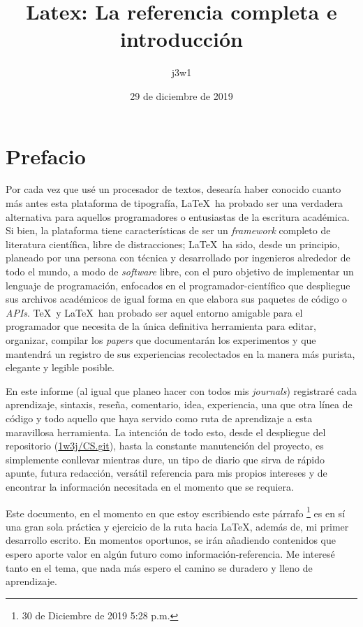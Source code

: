 \documentclass[11pt,a4paper]{book}
\title{Latex: La referencia completa e introducción}
\author{j3w1}
\date{29 de diciembre de 2019}
\begin{document}
	
	\thispagestyle{plain}
    \maketitle

    \section*{Prefacio}\label{sec:preface}
    \noindent Por cada vez que usé un procesador de textos, desearía haber conocido cuanto más antes esta plataforma de tipografía, \LaTeX\ ha probado ser una verdadera alternativa para aquellos programadores o entusiastas de la escritura académica.
    Si bien, la plataforma tiene características de ser un \emph{framework} completo de literatura científica, libre de distracciones; \LaTeX\ ha sido, desde un principio, planeado por una persona con técnica y desarrollado por ingenieros alrededor de todo el mundo, a modo de \emph{software} libre, con el puro objetivo de implementar un lenguaje de programación, enfocados en el programador-científico que despliegue sus archivos académicos de igual forma en que elabora sus paquetes de código o \emph{APIs}. \TeX\ y \LaTeX\ han probado ser aquel entorno amigable para el programador que necesita de la única definitiva herramienta para editar, organizar, compilar los \emph{papers} que documentarán los experimentos y que mantendrá un registro de sus experiencias recolectados en la manera más purista, elegante y legible posible.

    En este informe (al igual que planeo hacer con todos mis \emph{journals}) registraré cada aprendizaje, sintaxis, reseña, comentario, idea, experiencia, una que otra línea de código y todo aquello que haya servido como ruta de aprendizaje a esta maravillosa herramienta.
    La intención de todo esto, desde el despliegue del repositorio (\href{https://github.com/1w3j/CS}{1w3j/CS.git}), hasta la constante manutención del proyecto, es simplemente conllevar mientras dure, un tipo de diario que sirva de rápido apunte, futura redacción, versátil referencia para mis propios intereses y de encontrar la información necesitada en el momento que se requiera.

    Este documento, en el momento en que estoy escribiendo este párrafo \footnote{30 de Diciembre de 2019 5:28 p.m.} es en sí una gran sola práctica y ejercicio de la ruta hacia \LaTeX, además de, mi primer desarrollo escrito.
    En momentos oportunos, se irán añadiendo contenidos que espero aporte valor en algún futuro como información-referencia.
    Me interesé tanto en el tema, que nada más espero el camino se duradero y lleno de aprendizaje.
    
\end{document}
